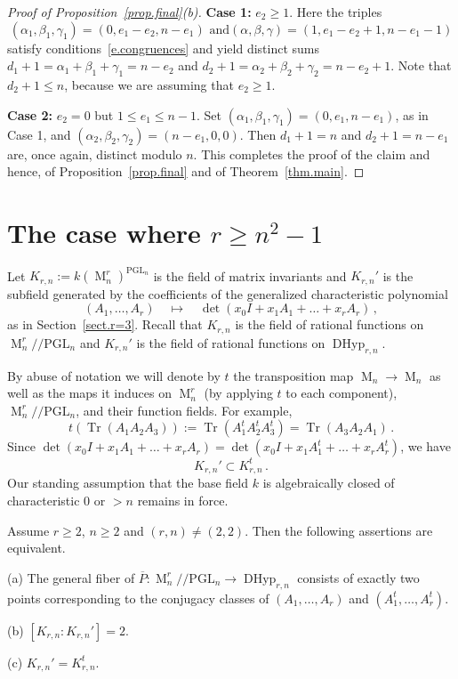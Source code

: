 \documentclass[12pt]{amsart}
\numberwithin{equation}{section}
\numberwithin{subsection}{section}
\theoremstyle{definition} \newtheorem{definition}[theorem]{Definition}
\newcommand\DHyp{\operatorname{DHyp}}
\newcommand{\PGL}{\mathrm{PGL}}
\newcommand{\tr}{\operatorname{Tr}}
\newcommand{\Mat}{\operatorname{M}}
\begin{document}
\begin{proof}[Proof of Proposition~\ref{prop.final}(b)]
\smallskip
{\bf Case 1:} $e_2 \geqslant 1$. Here the triples 
\[ \text{$(\alpha_1, \beta_1, \gamma_1) = (0, e_1 - e_2, n - e_1)$ 
and
$(\alpha, \beta, \gamma) = (1, e_1 - e_2 + 1, n - e_1 - 1)$} \] 
satisfy conditions~\eqref{e.congruences} and yield distinct sums
$d_1 + 1 = \alpha_1 + \beta_1 + \gamma_1 = n - e_2$ and
$d_2 + 1 = \alpha_2 + \beta_2 + \gamma_2 = n - e_2 + 1$.
Note that $d_2 + 1 \leqslant n$, because we are assuming 
that $e_2 \geqslant 1$.

\smallskip
{\bf Case 2:} $e_2 = 0$ but $1 \leqslant e_1 \leqslant n-1$. Set 
$(\alpha_1, \beta_1, \gamma_1) = (0, e_1, n - e_1)$, as in
Case 1,  and $(\alpha_2, \beta_2, \gamma_2) = (n - e_1, 0, 0)$.
Then $d_1 + 1 = n$ and $d_2 + 1 = n - e_1$ are, once again, distinct
modulo $n$.
This completes the proof of the claim and hence, 
of Proposition~\ref{prop.final} and of Theorem~\ref{thm.main}.
\end{proof}

\section{The case where $r \geqslant n^2 -1$}
\label{sect.frobenius}
  
Let $K_{r, n} := k(\Mat_n^r)^{\PGL_n}$ is the field of matrix invariants
and $K_{r, n}'$ is the subfield generated by the coefficients of the
generalized characteristic polynomial
\[ (A_1, \dots, A_r) \quad \mapsto \quad 
\det(x_0 I + x_1 A_1 + \dots + x_r A_r) \, , \]
as in Section~\ref{sect.r=3}. Recall that $K_{r, n}$ is
the field of rational functions on $\Mat_n^r /\! \!/\PGL_n$
and $K_{r, n}'$ is the field of rational functions on $\DHyp_{r, n}$.

By abuse of notation we will denote by $t$ the transposition map
$\Mat_n \to \Mat_n$ as well as the maps it induces on
$\Mat_n^r$ (by applying $t$ to each component),
$\Mat_n^r /\!\!/\PGL_n$, and their function fields.
For example, 
\[ t \left( \tr (A_1A_2 A_3) \right) := 
 \tr(A_1^t A_2^t A_3^t) = \tr(A_3 A_2 A_1) \, . 
\] 
Since $ \det(x_0 I + x_1 A_1 + \dots + x_r A_r) =
\det(x_0 I + x_1 A_1^t + \dots + x_r A_r^t)$, we have 
\begin{equation} \label{e.Krn} 
K_{r, n}' \subset K_{r, n}^t \, .
\end{equation}
Our standing assumption that the base field $k$ is algebraically closed
of characteristic $0$ or $> n$ remains in force.

\begin{lemma} \label{lem.conditions}
Assume $r \geqslant 2$, $n \geqslant 2$ and $(r, n) \neq (2, 2)$.
Then the following assertions are equivalent.

\smallskip
(a) The general fiber of 
$\overline{P} \colon \Mat_n^r /\! \!/\PGL_n \to \DHyp_{r, n}$
consists of exactly two points corresponding to the conjugacy 
classes of $(A_1, \dots, A_r)$ and $(A_1^t, \dots, A_r^t)$.

\smallskip
(b) $[K_{r, n} : K_{r, n}'] = 2$.

\smallskip
(c) $K_{r, n}' = K_{r, n}^t$.
\end{lemma}
\end{document}

